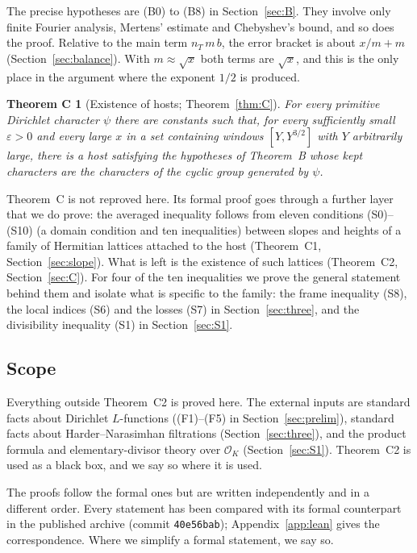\documentclass[11pt]{amsart}
\newcommand{\eps}{\varepsilon}
\newcommand{\Oc}{\mathcal{O}}
\theoremstyle{plain}
\newtheorem*{theoremC}{Theorem C}
\theoremstyle{definition}
\numberwithin{equation}{section}
\begin{document}
The precise hypotheses are (B0) to (B8) in Section~\ref{sec:B}. They involve only finite
Fourier analysis, Mertens' estimate and Chebyshev's bound, and so does the proof. Relative to the
main term $n_T\,m\,b$, the error bracket is about $x/m+m$ (Section~\ref{sec:balance}). With
$m\approx\sqrt x$ both terms are $\sqrt x$, and this is the only place in the argument where the
exponent $1/2$ is produced.

\begin{theoremC}[Existence of hosts; Theorem~\ref{thm:C}]
For every primitive Dirichlet character $\psi$ there are constants such that, for every
sufficiently small $\eps>0$ and every large $x$ in a set containing windows $[Y,Y^{3/2}]$ with $Y$
arbitrarily large, there is a host satisfying the hypotheses of Theorem~B whose kept characters
are the characters of the cyclic group generated by $\psi$.
\end{theoremC}

Theorem~C is not reproved here. Its formal proof goes through a further layer that we do prove:
the averaged inequality follows from eleven conditions (S0)--(S10) (a domain condition and ten
inequalities) between slopes and heights of a family of Hermitian lattices attached to the host
(Theorem~C1, Section~\ref{sec:slope}). What is left is the existence of such lattices (Theorem~C2,
Section~\ref{sec:C}). For four of the ten inequalities we prove the general statement behind them
and isolate what is specific to the family: the frame inequality (S8), the local indices (S6) and
the losses (S7) in Section~\ref{sec:three}, and the divisibility inequality (S1) in
Section~\ref{sec:S1}.

\subsection{Scope}

Everything outside Theorem~C2 is proved here. The external inputs are standard facts about
Dirichlet $L$-functions ((F1)--(F5) in Section~\ref{sec:prelim}), standard facts about
Harder--Narasimhan filtrations (Section~\ref{sec:three}), and the product formula and
elementary-divisor theory over $\Oc_K$ (Section~\ref{sec:S1}). Theorem~C2 is used as a black box,
and we say so where it is used.

The proofs follow the formal ones but are written independently and in a different order. Every
statement has been compared with its formal counterpart in the published archive (commit
\texttt{40e56bab}); Appendix~\ref{app:lean} gives the correspondence. Where we simplify a formal
statement, we say so.
\end{document}
